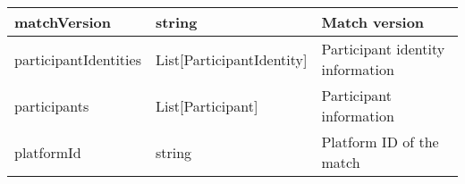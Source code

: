 \begin{table}[!h]
\begin{tabular}{llp{5cm}}
matchVersion          & string                        & Match version                                                                                                                                                                                                                                                                                                                                                                                                                                                                                                                                                                                                                           \\ \hline
participantIdentities & List{[}ParticipantIdentity{]} & Participant identity information                                                                                                                                                                                                                                                                                                                                                                                                                                                                                                                                                                                                        \\ \hline
participants          & List{[}Participant{]}         & Participant information                                                                                                                                                                                                                                                                                                                                                                                                                                                                                                                                                                                                                 \\ \hline
platformId            & string                        & Platform ID of the match                                                                                                                                                                                                                                                                                                                                                                                                                                                                                                                                                                                                                \\ \hline

\end{tabular}
\end{table}
